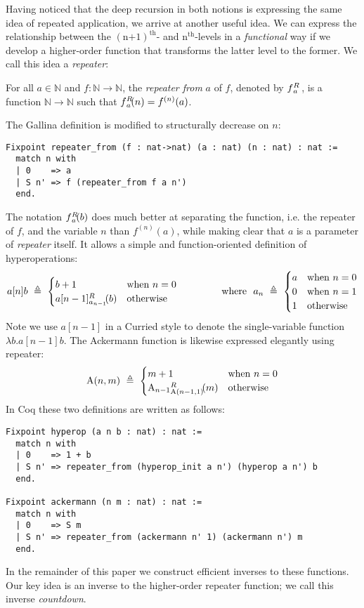Having noticed that the deep recursion in both notions is expressing the same idea
of repeated application, we arrive at another useful idea. We can express the relationship
between the $(\text{n+1})^{\text{th}}$- and $\text{n}^{\text{th}}$-levels in
a \emph{functional} way if we develop a higher-order function that transforms the latter level
to the former.  We call this idea a \emph{repeater}:
\begin{defn}
For all $a\in \mathbb{N}$ and $f: \mathbb{N}\to \mathbb{N}$, the \emph{repeater from} $a$ of $f$, denoted by $\rf{f}{a}$ , is a function $\mathbb{N}\to \mathbb{N}$ such that $\rf{f}{a}(n) = f^{(n)}(a)$.
\end{defn}
The Gallina definition is modified to structurally decrease on $n$:
\begin{lstlisting}
Fixpoint repeater_from (f : nat->nat) (a : nat) (n : nat) : nat :=
  match n with
  | 0    => a
  | S n' => f (repeater_from f a n')
  end.
\end{lstlisting}
The notation $\rf{f}{a}(b)$ does much better at separating the function, i.e. the repeater of $f$, and the variable $n$ than $f^{(n)}(a)$, while making clear that $a$ is a parameter of \emph{repeater} itself. It allows a simple and function-oriented definition of hyperoperations:
\begin{equation*}
a[n]b ~ \triangleq ~ \begin{cases}
b + 1 & \text{when } n = 0 \\
\rf{a[n-1]}{a_{n-1}}(b) & \text{otherwise}
\end{cases}
\qquad \qquad \text{ where } \ a_n ~ \triangleq ~ \begin{cases}
a & \text{when } n = 0 \\
0 & \text{when } n = 1 \\
1 & \text{otherwise}
\end{cases}
\end{equation*}
Note we use $a[n-1]$ in a Curried style to denote the single-variable function $\lambda b.a[n-1]b$.
The Ackermann function is likewise expressed elegantly using repeater:
\begin{equation*}
\Ack(n,m) ~ \triangleq ~ \begin{cases}
m + 1 & \text{when } n = 0 \\
\rf{\Ack_{n-1}}{\Ack(n-1,1)}(m) & \text{otherwise}
\end{cases}
\end{equation*}
In Coq these two definitions are written as follows:
\begin{lstlisting}
Fixpoint hyperop (a n b : nat) : nat :=
  match n with
  | 0    => 1 + b
  | S n' => repeater_from (hyperop_init a n') (hyperop a n') b
  end.

Fixpoint ackermann (n m : nat) : nat :=
  match n with
  | 0    => S m
  | S n' => repeater_from (ackermann n' 1) (ackermann n') m
  end.
\end{lstlisting}
In the remainder of this paper we construct efficient inverses to these
functions.  Our key idea is an inverse to the higher-order repeater function; we call this inverse \emph{countdown}.

